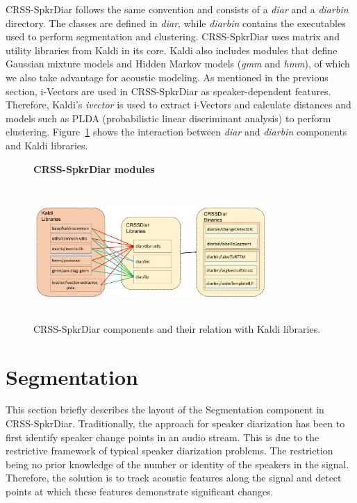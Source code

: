 CRSS-SpkrDiar follows the same convention and consists of a {\it diar} and a {\it diarbin} directory. 
The classes are defined in {\it diar}, while {\it diarbin} contains the executables used to perform segmentation and clustering. 
CRSS-SpkrDiar uses matrix and utility libraries from Kaldi in its core.  
Kaldi also includes modules that define Gaussian mixture models and Hidden Markov models ({\it gmm} and {\it hmm}), of which we also take advantage for acoustic modeling. 
As mentioned in the previous section, i-Vectors are used in CRSS-SpkrDiar as speaker-dependent features. 
Therefore, Kaldi's {\it ivector} is used to extract i-Vectors and calculate distances and models such as PLDA (probabilistic linear discriminant analysis) to perform clustering. 
Figure~\ref{fig:ch5_crssdiar_vs_kaldi} shows the interaction between {\it diar} and {\it diarbin} components and Kaldi libraries. 

\begin{figure}[t!]
	\centering
	\textbf{CRSS-SpkrDiar modules}\par\medskip
	\includegraphics[height = 2in, width=0.8\textwidth]{figures/crssdiar_and_kaldi}
	\caption{ \small CRSS-SpkrDiar components and their relation with Kaldi libraries.  }
	\label{fig:ch5_crssdiar_vs_kaldi}
	\vspace{-3mm}
\end{figure}

\section{Segmentation}
\label{sec:segmentation}
This section briefly describes the layout of the Segmentation component in CRSS-SpkrDiar. 
Traditionally, the approach for speaker diarization has been to first identify speaker change points in an audio stream. 
This is due to the restrictive framework of typical speaker diarization problems. 
The restriction being no prior knowledge of the number or identity of the speakers in the signal. 
Therefore, the solution is to track acoustic features along the signal and detect points at which these features demonstrate significant changes. 

